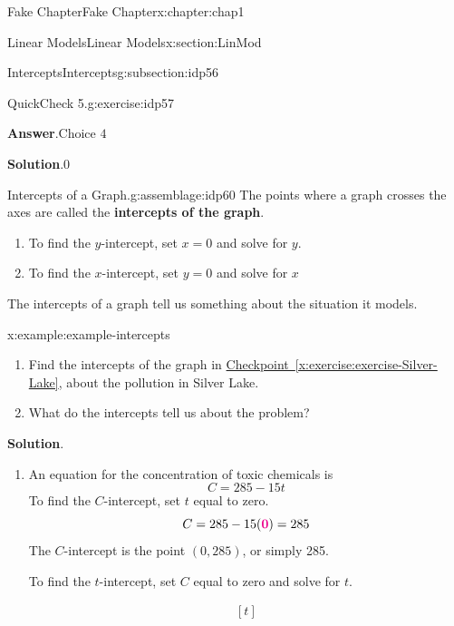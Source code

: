 \documentclass[oneside,10pt,]{book}
\newcommand{\blocktitlefont}{\relax}
\newcommand{\xreffont}{\relax}
\newcommand{\terminology}[1]{\textbf{#1}}
\numberwithin{equation}{section}
\newcommand{\alert}[1]{\boldsymbol{\color{magenta}{#1}}}
\begin{document}
\begin{chapterptx}{Fake Chapter}{}{Fake Chapter}{}{}{x:chapter:chap1}
\begin{sectionptx}{Linear Models}{}{Linear Models}{}{}{x:section:LinMod}
\begin{subsectionptx}{Intercepts}{}{Intercepts}{}{}{g:subsection:idp56}
\begin{inlineexercise}{QuickCheck 5.}{g:exercise:idp57}
\begin{itemize}[label=$\odot$,leftmargin=3em,]
\end{itemize}
%
\par\smallskip%
\noindent\textbf{\blocktitlefont Answer}.\hypertarget{g:answer:idp58}{}\quad{}\(\text{Choice 4}\)%
\par\smallskip%
\noindent\textbf{\blocktitlefont Solution}.\hypertarget{g:solution:idp59}{}\quad{}\(0\)%
\end{inlineexercise}%
\begin{assemblage}{Intercepts of a Graph.}{g:assemblage:idp60}%
The points where a graph crosses the axes are called the \terminology{intercepts of the graph}.%
\begin{enumerate}
\item{}To find the \(y\)-intercept, set \(x=0\) and solve for \(y\).%
\item{}To find the \(x\)-intercept, set \(y=0\) and solve for \(x\)%
\end{enumerate}
%
\end{assemblage}
The intercepts of a graph tell us something about the situation it models.%
\begin{example}{}{x:example:example-intercepts}%
%
\begin{enumerate}[label=\alph*]
\item{}Find the intercepts of the graph in \hyperref[x:exercise:exercise-Silver-Lake]{Checkpoint~{\xreffont\ref{x:exercise:exercise-Silver-Lake}}}, about the pollution in Silver Lake.%
\item{}What do the intercepts tell us about the problem?%
\end{enumerate}
%
\par\smallskip%
\noindent\textbf{\blocktitlefont Solution}.\hypertarget{g:solution:idp61}{}\quad{}%
\begin{enumerate}[label=\alph*]
\item{}An equation for the concentration of toxic chemicals is%
\begin{equation*}
C=285-15t
\end{equation*}
To find the \(C\)-intercept, set \(t\) equal to zero.%
\begin{equation*}
C=285-15(\alert{0})=285
\end{equation*}
The \(C\)-intercept is the point \((0, 285)\), or simply 285.%
\par
To find the \(t\)-intercept, set \(C\) equal to zero and solve for \(t\).%
\par
%
\begin{equation*}
\begin{aligned}[t]

\end{aligned}
\end{equation*}
\end{enumerate}
\end{example}
\end{subsectionptx}
\end{sectionptx}
\end{chapterptx}
\end{document}
